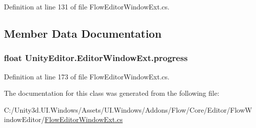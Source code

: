 Definition at line 131 of file Flow\+Editor\+Window\+Ext.\+cs.



\subsection{Member Data Documentation}
\hypertarget{class_unity_editor_1_1_editor_window_ext_ad4fc5cfe734a2117bf611005da84573e}{}
\subsubsection[{progress}]{\setlength{\rightskip}{0pt plus 5cm}float Unity\+Editor.\+Editor\+Window\+Ext.\+progress\hspace{0.3cm}{\ttfamily [protected]}}\label{class_unity_editor_1_1_editor_window_ext_ad4fc5cfe734a2117bf611005da84573e}


Definition at line 173 of file Flow\+Editor\+Window\+Ext.\+cs.



The documentation for this class was generated from the following file\+:\begin{DoxyCompactItemize}
\item 
C\+:/\+Unity3d.\+U\+I.\+Windows/\+Assets/\+U\+I.\+Windows/\+Addons/\+Flow/\+Core/\+Editor/\+Flow\+Window\+Editor/\hyperlink{_flow_editor_window_ext_8cs}{Flow\+Editor\+Window\+Ext.\+cs}\end{DoxyCompactItemize}
